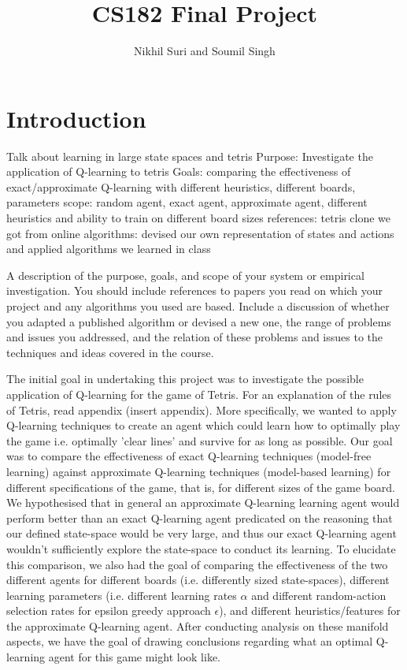\documentclass[11pt]{article}
\title{CS182 Final Project}
\author{Nikhil Suri and Soumil Singh}
\begin{document}
\maketitle{}


\section{Introduction}

Talk about
learning in large state spaces and tetris
Purpose:
Investigate the application of Q-learning to tetris
Goals: comparing the effectiveness of exact/approximate Q-learning with different heuristics, different boards, parameters
scope: random agent, exact agent, approximate agent, different heuristics and ability to train on different board sizes
references: tetris clone we got from online
algorithms: devised our own representation of states and actions and applied algorithms we learned in class

A description of the purpose, goals, and scope of your system or
empirical investigation.  You should include references to papers you
read on which your project and any algorithms you used are
based. Include a discussion of whether you adapted a published
algorithm or devised a new one, the range of problems and issues you
addressed, and the relation of these problems and issues to the
techniques and ideas covered in the course.

The initial goal in undertaking this project was to investigate the possible application of Q-learning for the game of Tetris. For an explanation of the rules of Tetris, read appendix (insert appendix). More specifically, we wanted to apply Q-learning techniques to create an agent which could learn how to optimally play the game i.e. optimally 'clear lines' and survive for as long as possible. Our goal was to compare the effectiveness of exact Q-learning techniques (model-free learning) against approximate Q-learning techniques (model-based learning) for different specifications of the game, that is, for different sizes of the game board. We hypothesised that in general an approximate Q-learning learning agent would perform better than an exact Q-learning agent predicated on the reasoning that our defined state-space would be very large, and thus our exact Q-learning agent wouldn't sufficiently explore the state-space to conduct its learning. To elucidate this comparison, we also had the goal of comparing the effectiveness of the two different agents for different boards (i.e. differently sized state-spaces), different learning parameters (i.e. different learning rates $\alpha$ and different random-action selection rates for epsilon greedy approach $\epsilon$), and different heuristics/features for the approximate Q-learning agent. After conducting analysis on these manifold aspects, we have the goal of drawing conclusions regarding what an optimal Q-learning agent for this game might look like.
\end{document}
